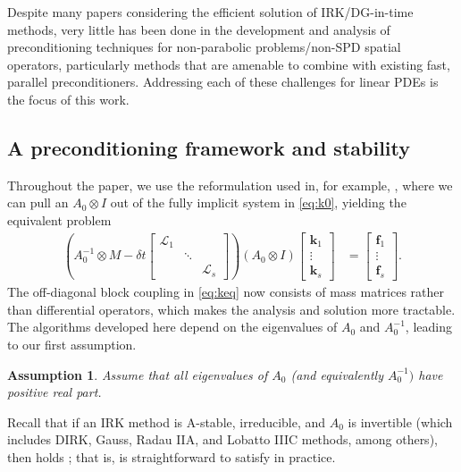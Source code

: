 \documentclass[a4paper,10pt]{article}
\newtheorem{assumption}{Assumption}
\begin{document}
Despite many papers considering the efficient solution of IRK/DG-in-time methods,
very little has been done in the development and analysis of preconditioning techniques
for non-parabolic problems/non-SPD spatial operators, particularly methods that are
amenable to combine with existing fast, parallel preconditioners. Addressing each
of these challenges for linear PDEs is the focus of this work.

\subsection{A preconditioning framework and stability}\label{sec:intro:stab}

Throughout the paper, we use the reformulation used in, for example,
\cite{pazner17}, where we can pull an $A_0\otimes I$ out of the
fully implicit system in \eqref{eq:k0}, yielding the equivalent problem
%
\begin{align}\label{eq:keq}
\left( A_0^{-1}\otimes M - \delta t \begin{bmatrix} \mathcal{L}_1  & \\ & \ddots \\ && \mathcal{L}_s\end{bmatrix}\right)
	(A_0\otimes I)	\begin{bmatrix} \mathbf{k}_1 \\ \vdots \\ \mathbf{k}_s \end{bmatrix}
& = \begin{bmatrix} \mathbf{f}_1 \\ \vdots \\ \mathbf{f}_s \end{bmatrix}.
\end{align}
%
The off-diagonal block coupling in \eqref{eq:keq} now consists of mass matrices
rather than differential operators, which makes the analysis and solution more
tractable.
The algorithms developed here depend on the eigenvalues of $A_0$ and
$A_0^{-1}$, leading to our first assumption.
%
\begin{assumption} \label{ass:eig}
Assume that all eigenvalues of $A_0$ (and equivalently $A_0^{-1})$ have positive real part.
\end{assumption}
%
Recall that if an IRK method is A-stable, irreducible, and $A_0$ is invertible
(which includes DIRK, Gauss, Radau IIA, and Lobatto IIIC methods, among others),
then  holds \cite{hairer96}; that is,  is
straightforward to satisfy in practice.
\end{document}
